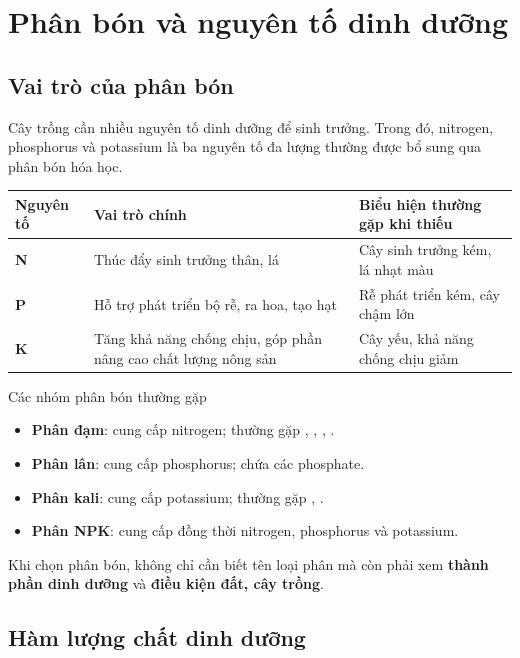 \section{Phân bón và nguyên tố dinh dưỡng}

\subsection{Vai trò của phân bón}

Cây trồng cần nhiều nguyên tố dinh dưỡng để sinh trưởng. Trong đó, nitrogen, phosphorus và potassium là ba nguyên tố đa lượng thường được bổ sung qua phân bón hóa học.

\begin{center}
\begin{tabularx}{0.96\textwidth}{>{\bfseries}C{2.2cm}YC{3.5cm}}
\toprule
Nguyên tố & Vai trò chính & Biểu hiện thường gặp khi thiếu \\
\midrule
N & Thúc đẩy sinh trưởng thân, lá & Cây sinh trưởng kém, lá nhạt màu \\
P & Hỗ trợ phát triển bộ rễ, ra hoa, tạo hạt & Rễ phát triển kém, cây chậm lớn \\
K & Tăng khả năng chống chịu, góp phần nâng cao chất lượng nông sản & Cây yếu, khả năng chống chịu giảm \\
\bottomrule
\end{tabularx}
\end{center}

\begin{ghinho}{Các nhóm phân bón thường gặp}
\begin{itemize}
\item \textbf{Phân đạm}: cung cấp nitrogen; thường gặp , , , .
\item \textbf{Phân lân}: cung cấp phosphorus; chứa các phosphate.
\item \textbf{Phân kali}: cung cấp potassium; thường gặp , .
\item \textbf{Phân NPK}: cung cấp đồng thời nitrogen, phosphorus và potassium.
\end{itemize}
\end{ghinho}

Khi chọn phân bón, không chỉ cần biết tên loại phân mà còn phải xem \textbf{thành phần dinh dưỡng} và \textbf{điều kiện đất, cây trồng}.

\subsection{Hàm lượng chất dinh dưỡng}

